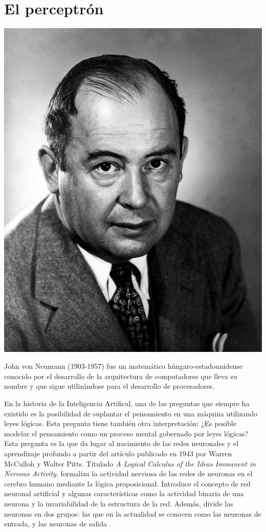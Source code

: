 \documentclass[11pt,twoside,titlepage,a4paper]{article}
\numberwithin{equation}{section} %
\theoremstyle{usual}
\begin{document}
\newpage
\section{El perceptrón}

\begin{marginfigure}
    \includegraphics[width=\marginparwidth]{Source/images/Von_Neumann.jpg}
    \caption{John von Neumann (1903-1957) fue un matemático 
    húngaro-estadounidense conocido por el desarrollo de la arquitectura
    de computadores que lleva su nombre y que sigue utilizándose para el
    desarrollo de procesadores.}
\end{marginfigure}

En la historia de la Inteligencia Artifical, una de las preguntas que siempre ha existido
es la posibilidad de suplantar el pensamiento en una máquina utilizando leyes lógicas.
Esta pregunta tiene también otra interpretación: ¿Es posible modelar el pensamiento como 
un proceso mental gobernado por leyes lógicas? Esta pregunta es la que da lugar al
nacimiento de las redes neuronales y el aprendizaje profundo a partir del artículo
publicado en 1943 por Warren McCulloh y Walter Pitts. Titulado \textit{A Logical Calculus of the
Ideas Immanent in Nervous Activity}, formaliza la actividad nerviosa de las redes de 
neuronas en el cerebro humano mediante la lógica proposicional. Introduce el concepto de 
red neuronal artificial y algunas características como la actividad binaria de una neurona y la 
invariabilidad de la estructura de la red. Además, divide las neuronas en dos
grupos: las que en la actualidad se conocen como las neuronas de
entrada, y las neuronas de salida \cite{mcculloh-pitts}.
\end{document}
